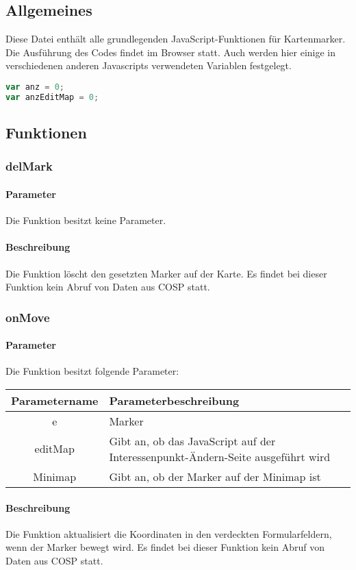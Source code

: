 \subsection{Allgemeines} Diese Datei enthält alle grundlegenden JavaScript-Funktionen für Kartenmarker.
Die Ausführung des Codes findet im Browser statt. Auch werden hier einige in verschiedenen anderen Javascripts verwendeten Variablen festgelegt.
\begin{lstlisting}[language=JavaScript]
var anz = 0;
var anzEditMap = 0;
\end{lstlisting}
\newpage
\subsection{Funktionen}
\subsubsection{delMark}
\paragraph{Parameter} Die Funktion besitzt keine Parameter.
\paragraph{Beschreibung} Die Funktion löscht den gesetzten Marker auf der Karte. Es findet bei dieser Funktion kein Abruf von Daten aus {\glqq COSP\grqq} statt.
\subsubsection{onMove}
\paragraph{Parameter} Die Funktion besitzt folgende Parameter:
\begin{table}[H]
	\begin{tabular}{|c|p{11cm}|}
		\hline
		\textbf{Parametername} & \textbf{Parameterbeschreibung} \\ \hline
		e       & Marker \\ \hline
		editMap & Gibt an, ob das JavaScript auf der Interessenpunkt-Ändern-Seite ausgeführt wird \\ \hline
		Minimap & Gibt an, ob der Marker auf der Minimap ist \\ \hline
	\end{tabular}
\end{table}
\paragraph{Beschreibung} Die Funktion aktualisiert die Koordinaten in den verdeckten Formularfeldern, wenn der Marker bewegt wird. Es findet bei dieser Funktion kein Abruf von Daten aus {\glqq COSP\grqq} statt.
